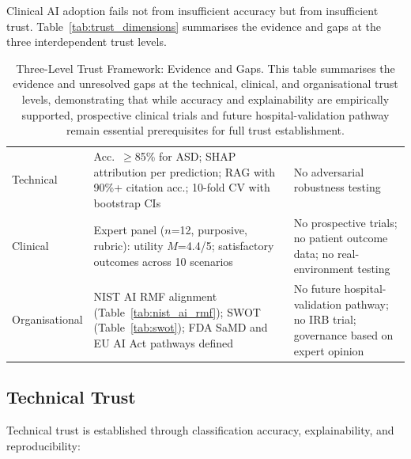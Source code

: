\noindent Clinical AI adoption fails not from insufficient accuracy but from insufficient trust. Table~\ref{tab:trust_dimensions} summarises the evidence and gaps at the three interdependent trust levels.

\begin{table}[H]
\tablestripes\tablefontsize
\tablefontsize
\centering
\caption[Three-Level Trust Framework: Evidence and Gaps]{Three-Level Trust Framework: Evidence and Gaps. This table summarises the evidence and unresolved gaps at the technical, clinical, and organisational trust levels, demonstrating that while accuracy and explainability are empirically supported, prospective clinical trials and future hospital-validation pathway remain essential prerequisites for full trust establishment.}
\begin{tabularx}{\textwidth}{@{} >{\raggedright\arraybackslash}p{1.8cm} L L @{}}
\toprule
{} &  &  \\
\midrule
Technical & Acc.\ $\geq$85\% for ASD; SHAP attribution per prediction; RAG with 90\%+ citation acc.; 10-fold CV with bootstrap CIs & No adversarial robustness testing \\
\addlinespace
Clinical & Expert panel ($n$=12, purposive, rubric): utility $M$=4.4/5; satisfactory outcomes across 10 scenarios & No prospective trials; no patient outcome data; no real-environment testing \\
\addlinespace
Organisational & NIST AI RMF alignment (Table~\ref{tab:nist_ai_rmf}); SWOT (Table~\ref{tab:swot}); FDA SaMD and EU AI Act pathways defined & No future hospital-validation pathway; no IRB trial; governance based on expert opinion \\
\bottomrule
\end{tabularx}
\end{table}

\iffalse
\subsection{Technical Trust}

Technical trust is established through classification accuracy, explainability, and reproducibility:

